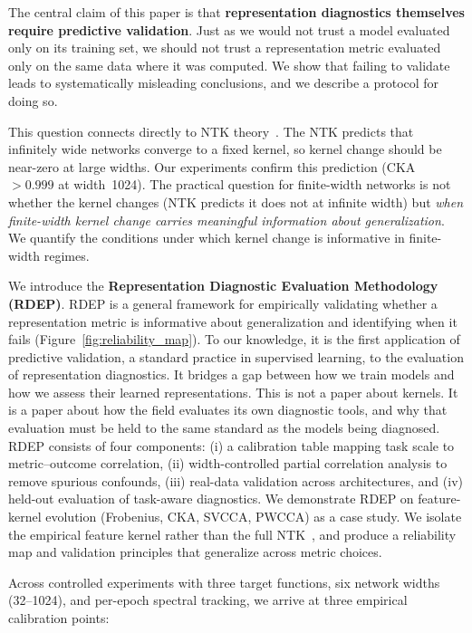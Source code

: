 \documentclass[10pt]{article}
\begin{document}
The central claim of this paper is that \textbf{representation diagnostics themselves require predictive validation}. Just as we would not trust a model evaluated only on its training set, we should not trust a representation metric evaluated only on the same data where it was computed. We show that failing to validate leads to systematically misleading conclusions, and we describe a protocol for doing so.

This question connects directly to NTK theory~\citep{jacot2018neural}. The NTK predicts that infinitely wide networks converge to a fixed kernel, so kernel change should be near-zero at large widths. Our experiments confirm this prediction (CKA $>0.999$ at width~1024). The practical question for finite-width networks is not whether the kernel changes (NTK predicts it does not at infinite width) but \emph{when finite-width kernel change carries meaningful information about generalization}. We quantify the conditions under which kernel change is informative in finite-width regimes.

We introduce the \textbf{Representation Diagnostic Evaluation Methodology (RDEP)}. RDEP is a general framework for empirically validating whether a representation metric is informative about generalization and identifying when it fails (Figure~\ref{fig:reliability_map}). To our knowledge, it is the first application of predictive validation, a standard practice in supervised learning, to the evaluation of representation diagnostics. It bridges a gap between how we train models and how we assess their learned representations. This is not a paper about kernels. It is a paper about how the field evaluates its own diagnostic tools, and why that evaluation must be held to the same standard as the models being diagnosed. RDEP consists of four components: (i) a calibration table mapping task scale to metric--outcome correlation, (ii) width-controlled partial correlation analysis to remove spurious confounds, (iii) real-data validation across architectures, and (iv) held-out evaluation of task-aware diagnostics. We demonstrate RDEP on feature-kernel evolution (Frobenius, CKA, SVCCA, PWCCA) as a case study. We isolate the empirical feature kernel rather than the full NTK~\citep{jacot2018neural}, and produce a reliability map and validation principles that generalize across metric choices.

Across controlled experiments with three target functions, six network widths (32--1024), and per-epoch spectral tracking, we arrive at three empirical calibration points:
\end{document}
